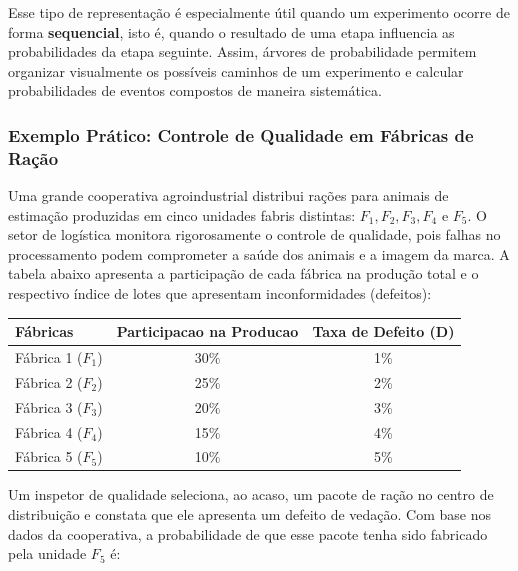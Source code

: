 Esse tipo de representação é especialmente útil quando um experimento ocorre de
forma \textbf{sequencial}, isto é, quando o resultado de uma etapa influencia as
probabilidades da etapa seguinte. Assim, árvores de probabilidade permitem
organizar visualmente os possíveis caminhos de um experimento e calcular
probabilidades de eventos compostos de maneira sistemática. \vskip0.3cm



\subsubsection{Exemplo Prático: Controle de Qualidade em Fábricas de Ração} \vskip0.3cm

Uma grande cooperativa agroindustrial distribui rações para animais de estimação produzidas em cinco unidades fabris distintas: $F_1, F_2, F_3, F_4$ e $F_5$. O setor de logística monitora rigorosamente o controle de qualidade, pois falhas no processamento podem comprometer a saúde dos animais e a imagem da marca. A tabela abaixo apresenta a participação de cada fábrica na produção total e o respectivo índice de lotes que apresentam inconformidades (defeitos):

\begin{table}[H]
\centering
\small
\begin{tabular}{l|c|c}
\hline \hline
\textbf{Fábricas} & \textbf{Participacao na Producao} & \textbf{Taxa de Defeito (D)} \\
\hline \hline
Fábrica 1 ($F_1$) & 30\% & 1\% \\
Fábrica 2 ($F_2$) & 25\% & 2\% \\
Fábrica 3 ($F_3$) & 20\% & 3\% \\
Fábrica 4 ($F_4$) & 15\% & 4\% \\
Fábrica 5 ($F_5$) & 10\% & 5\% \\
\hline \hline
\end{tabular}
\end{table}


Um inspetor de qualidade seleciona, ao acaso, um pacote de ração no centro de distribuição e constata que ele apresenta um defeito de vedação. Com base nos dados da cooperativa, a probabilidade de que esse pacote tenha sido fabricado pela unidade $F_5$ é:

\newpage


